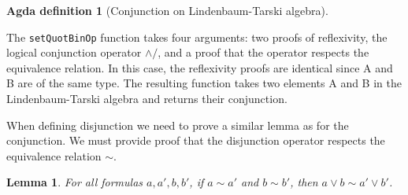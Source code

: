 \documentclass[titlepage]{article}
\newtheorem{lemma}{Lemma}[section]
\newtheorem{agdadef}{Agda definition}
\begin{document}
\begin{agdadef}[Conjunction on Lindenbaum-Tarski algebra]$ $
\end{agdadef}


The \texttt{setQuotBinOp} function takes four arguments: two proofs of reflexivity, the logical conjunction operator $\wedge/$, and a proof that the operator respects the equivalence relation. In this case, the reflexivity proofs are identical since A and B are of the same type. The resulting function takes two elements A and B in the Lindenbaum-Tarski algebra and returns their conjunction.

When defining disjunction we need to prove a similar lemma as for the conjunction. We must provide proof that the disjunction operator respects the equivalence relation $\sim$.

\begin{lemma}
    For all formulas $a,a',b,b'$, if $a\sim a'$ and $b \sim b'$, then $a \vee b \sim a' \vee b'$.
\end{lemma}
\end{document}
